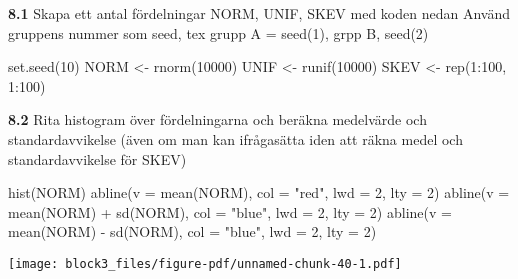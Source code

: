 \documentclass[
  letterpaper,
  DIV=11,
  numbers=noendperiod]{scrartcl}
\newenvironment{Shaded}{\begin{snugshade}}{\end{snugshade}}
\newcommand{\AttributeTok}[1]{\textcolor[rgb]{0.40,0.45,0.13}{#1}}
\newcommand{\DecValTok}[1]{\textcolor[rgb]{0.68,0.00,0.00}{#1}}
\newcommand{\FunctionTok}[1]{\textcolor[rgb]{0.28,0.35,0.67}{#1}}
\newcommand{\NormalTok}[1]{\textcolor[rgb]{0.00,0.23,0.31}{#1}}
\newcommand{\OtherTok}[1]{\textcolor[rgb]{0.00,0.23,0.31}{#1}}
\newcommand{\SpecialCharTok}[1]{\textcolor[rgb]{0.37,0.37,0.37}{#1}}
\newcommand{\StringTok}[1]{\textcolor[rgb]{0.13,0.47,0.30}{#1}}
\begin{document}
\textbf{8.1} Skapa ett antal fördelningar NORM, UNIF, SKEV med koden
nedan Använd gruppens nummer som seed, tex grupp A = seed(1), grpp B,
seed(2)

\begin{Shaded}
\begin{Highlighting}[]
\FunctionTok{set.seed}\NormalTok{(}\DecValTok{10}\NormalTok{)}
\NormalTok{NORM }\OtherTok{\textless{}{-}} \FunctionTok{rnorm}\NormalTok{(}\DecValTok{10000}\NormalTok{)}
\NormalTok{UNIF }\OtherTok{\textless{}{-}} \FunctionTok{runif}\NormalTok{(}\DecValTok{10000}\NormalTok{)}
\NormalTok{SKEV }\OtherTok{\textless{}{-}} \FunctionTok{rep}\NormalTok{(}\DecValTok{1}\SpecialCharTok{:}\DecValTok{100}\NormalTok{, }\DecValTok{1}\SpecialCharTok{:}\DecValTok{100}\NormalTok{)}
\end{Highlighting}
\end{Shaded}

\textbf{8.2} Rita histogram över fördelningarna och beräkna medelvärde
och standardavvikelse (även om man kan ifrågasätta iden att räkna medel
och standardavvikelse för SKEV)

\begin{Shaded}
\begin{Highlighting}[]
\FunctionTok{hist}\NormalTok{(NORM)}
\FunctionTok{abline}\NormalTok{(}\AttributeTok{v =} \FunctionTok{mean}\NormalTok{(NORM), }\AttributeTok{col =} \StringTok{"red"}\NormalTok{, }\AttributeTok{lwd =} \DecValTok{2}\NormalTok{, }\AttributeTok{lty =} \DecValTok{2}\NormalTok{)}
\FunctionTok{abline}\NormalTok{(}\AttributeTok{v =} \FunctionTok{mean}\NormalTok{(NORM) }\SpecialCharTok{+} \FunctionTok{sd}\NormalTok{(NORM), }\AttributeTok{col =} \StringTok{"blue"}\NormalTok{, }\AttributeTok{lwd =} \DecValTok{2}\NormalTok{, }\AttributeTok{lty =} \DecValTok{2}\NormalTok{)}
\FunctionTok{abline}\NormalTok{(}\AttributeTok{v =} \FunctionTok{mean}\NormalTok{(NORM) }\SpecialCharTok{{-}} \FunctionTok{sd}\NormalTok{(NORM), }\AttributeTok{col =} \StringTok{"blue"}\NormalTok{, }\AttributeTok{lwd =} \DecValTok{2}\NormalTok{, }\AttributeTok{lty =} \DecValTok{2}\NormalTok{)}
\end{Highlighting}
\end{Shaded}

\texttt{[image: block3\_files/figure-pdf/unnamed-chunk-40-1.pdf]}
\end{document}
